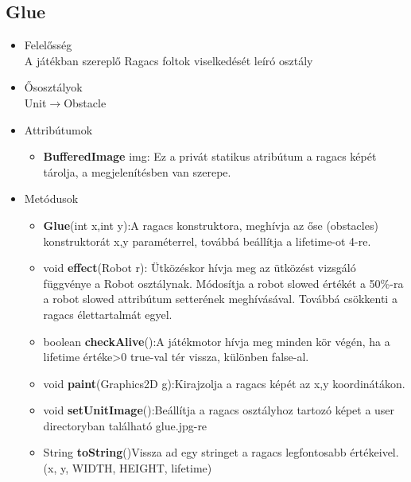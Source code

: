 \subsection{Glue}
\begin{itemize}
\item Felelősség\\
A játékban szereplő Ragacs foltok viselkedését leíró osztály
\item Ősosztályok\\
Unit$\rightarrow$Obstacle
\item Attribútumok
	\begin{itemize}
		\item \textbf{BufferedImage} img: Ez a privát statikus atribútum a ragacs képét tárolja,                                      a megjelenítésben van szerepe.
	\end{itemize}
\item Metódusok
	\begin{itemize}
		\item  \textbf{Glue}(int x,int y):A ragacs konstruktora, meghívja az őse (obstacles)                           konstruktorát x,y paraméterrel, továbbá beállítja a lifetime-ot 4-re.
		
		\item void \textbf{effect}(Robot r): Ütközéskor hívja meg az ütközést vizsgáló függvénye     a Robot osztálynak. Módosítja a robot slowed értékét a 50\%-ra a robot slowed attribútum         setterének meghívásával. Továbbá csökkenti a ragacs élettartalmát egyel.
	
		\item boolean \textbf{checkAlive}():A játékmotor hívja meg minden kör végén, ha a lifetime értéke>0 true-val tér vissza, különben false-al.
			\item void \textbf{paint}(Graphics2D g):Kirajzolja a ragacs képét az x,y koordinátákon.
				\item void \textbf{setUnitImage}():Beállítja a ragacs osztályhoz tartozó képet a user directoryban található glue.jpg-re
			\item String \textbf{toString}()Vissza ad egy stringet a  ragacs legfontosabb értékeivel.(x, y, WIDTH, HEIGHT, lifetime)
		
	\end{itemize}
\end{itemize}

